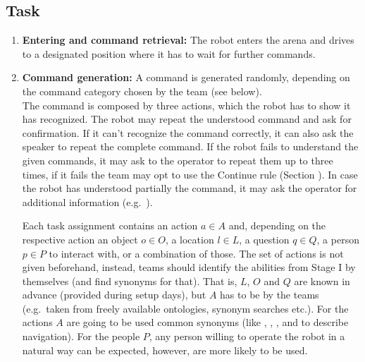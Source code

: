 \subsection{Task}

\begin{enumerate}
	\item \textbf{Entering and command retrieval:} The robot enters the arena and drives to a designated position where it has to wait for further commands.
	\item \textbf{Command generation:} A command is generated randomly, depending on the command category chosen by the team (see below). \\
	
	The command is composed by three actions, which the robot has to show it has recognized. The robot may repeat the understood command and ask for confirmation. If it can't recognize the command correctly, it can also ask the speaker to repeat the complete command. If the robot fails to understand the given commands, it may ask to the operator to repeat them up to three times, if it fails the team may opt to use the Continue rule (Section ). In case the robot has understood partially the command, it may ask the operator for additional information (e.g.~).

	Each task assignment contains an action $a \in A$ and, depending on the respective action an object $o \in O$, a location $l \in L$, a question $q \in Q$, a person $p \in P$ to interact with, or a combination of those. The set of actions is not given beforehand, instead, teams should identify the abilities from Stage I by themselves (and find synonyms for that). That is, $L$, $O$ and $Q$ are known in advance (provided during setup days), but $A$ has to be  by the teams (e.g.~taken from freely available ontologies, synonym searches etc.). For the actions $A$ are going to be used common synonyms (like , , , and  to describe navigation). For the people $P$, any person willing to operate the robot in a natural way can be expected, however,  are more likely to be used.


\end{enumerate}
